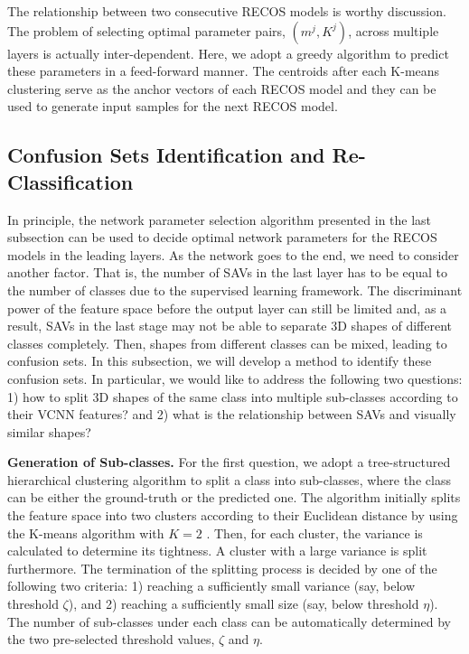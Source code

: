 \documentclass[preprint,12pt]{elsarticle}
\begin{document}
The relationship between two consecutive RECOS models is worthy
discussion. The problem of selecting optimal parameter pairs, $(m^j,
K^j)$, across multiple layers is actually inter-dependent.  Here, we
adopt a greedy algorithm to predict these parameters in a feed-forward
manner. The centroids after each K-means clustering serve as the anchor
vectors of each RECOS model and they can be used to generate input
samples for the next RECOS model. 

\subsection{Confusion Sets Identification and Re-Classification} \label{sec.identifying}

In principle, the network parameter selection algorithm presented in the
last subsection can be used to decide optimal network parameters for the
RECOS models in the leading layers.  As the network goes to the end, we
need to consider another factor. That is, the number of SAVs in the last
layer has to be equal to the number of classes due to the supervised
learning framework.  The discriminant power of the feature space before
the output layer can still be limited and, as a result, SAVs in the last
stage may not be able to separate 3D shapes of different classes
completely. Then, shapes from different classes can be mixed, leading to
confusion sets. In this subsection, we will develop a method to identify
these confusion sets. In particular, we would like to address the
following two questions: 1) how to split 3D shapes of the same class
into multiple sub-classes according to their VCNN features? and 2) what
is the relationship between SAVs and visually similar shapes? 

{\bf Generation of Sub-classes.} For the first question, we adopt a
tree-structured hierarchical clustering algorithm to split a class into
sub-classes, where the class can be either the ground-truth or the
predicted one. The algorithm initially splits the feature space into two
clusters according to their Euclidean distance by using the K-means
algorithm with $K=2$ \cite{hartigan1979algorithm}.  Then, for each
cluster, the variance is calculated to determine its tightness. A
cluster with a large variance is split furthermore. The termination of
the splitting process is decided by one of the following two criteria:
1) reaching a sufficiently small variance (say, below threshold
$\zeta$), and 2) reaching a sufficiently small size (say, below
threshold $\eta$). The number of sub-classes under each class can be
automatically determined by the two pre-selected threshold values,
$\zeta$ and $\eta$. 
\end{document}
